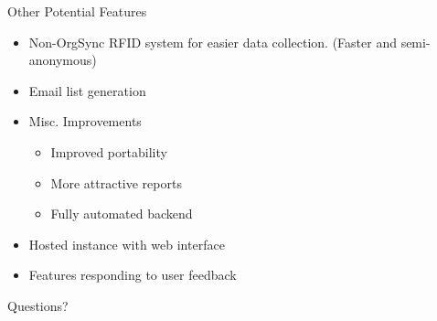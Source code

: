 \documentclass{beamer}
\begin{document}
\begin{frame}{Other Potential Features}
    \begin{itemize}
        \item Non-OrgSync RFID system for easier data collection. (Faster and semi-anonymous)
        \item Email list generation
        \item Misc. Improvements
            \begin{itemize}
                \item Improved portability
                \item More attractive reports
                \item Fully automated backend
            \end{itemize}
        \item Hosted instance with web interface
        \item Features responding to user feedback 
    \end{itemize}
\end{frame}

\begin{frame}[standout]
    Questions?
\end{frame}
\end{document}

